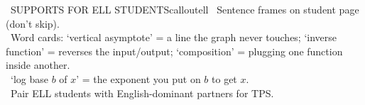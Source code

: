 \documentclass[11pt]{article}
\begin{document}
\begin{callout}{\IconGlobe\ SUPPORTS FOR ELL STUDENTS}{calloutell}
\textbullet\ Sentence frames on student page (don't skip).\\
\textbullet\ Word cards: `vertical asymptote' = a line the graph never touches; `inverse function' = reverses the input/output; `composition' = plugging one function inside another.\\
\textbullet\ `log base \(b\) of \(x\)' = the exponent you put on \(b\) to get \(x\).\\
\textbullet\ Pair ELL students with English-dominant partners for TPS.
\end{callout}
\end{document}
